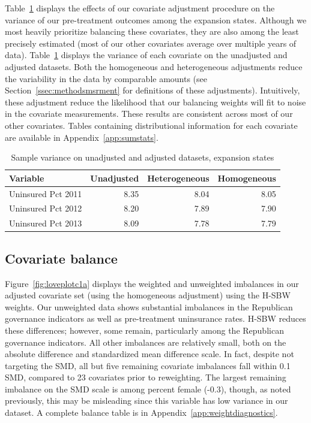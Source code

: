 \documentclass[aoas]{imsart}
\theoremstyle{plain}
\theoremstyle{remark}
\begin{document}
Table~\ref{tab:adjust1} displays the effects of our covariate adjustment procedure on the variance of our pre-treatment outcomes among the expansion states. Although we most heavily prioritize balancing these covariates, they are also among the least precisely estimated (most of our other covariates average over multiple years of data). Table~\ref{tab:adjust1} displays the variance of each covariate on the unadjusted and adjusted datasets. Both the homogeneous and heterogeneous adjustments reduce the variability in the data by comparable amounts (see Section~\ref{ssec:methodsmsrment} for definitions of these adjustments). Intuitively, these adjustment reduce the likelihood that our balancing weights will fit to noise in the covariate measurements. These results are consistent across most of our other covariates. Tables containing distributional information for each covariate are available in Appendix~\ref{app:sumstats}. 

\begin{table}[ht]
\caption{Sample variance on unadjusted and adjusted datasets, expansion states}\label{tab:adjust1}
\begin{tabular}{lrrr}
  \hline
Variable & Unadjusted & Heterogeneous & Homogeneous \\ 
  \hline
Uninsured Pct 2011 & 8.35 & 8.04 & 8.05 \\ 
  Uninsured Pct 2012 & 8.20 & 7.89 & 7.90 \\ 
  Uninsured Pct 2013 & 8.09 & 7.78 & 7.79 \\ 
   \hline
\end{tabular}
\end{table}

\subsection{Covariate balance}

Figure~\ref{fig:loveplotc1a} displays the weighted and unweighted imbalances in our adjusted covariate set (using the homogeneous adjustment) using the H-SBW weights. Our unweighted data shows substantial imbalances in the Republican governance indicators as well as pre-treatment uninsurance rates. H-SBW reduces these differences; however, some remain, particularly among the Republican governance indicators. All other imbalances are relatively small, both on the absolute difference and standardized mean difference scale. In fact, despite not targeting the SMD, all but five remaining covariate imbalances fall within 0.1 SMD, compared to 23 covariates prior to reweighting. The largest remaining imbalance on the SMD scale is among percent female (-0.3), though, as noted previously, this may be misleading since this variable has low variance in our dataset. A complete balance table is in Appendix~\ref{app:weightdiagnostics}. 
\end{document}
